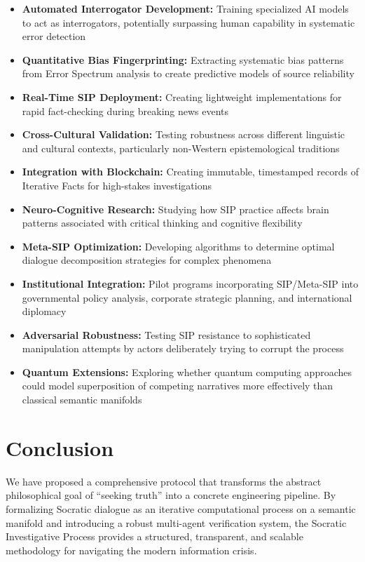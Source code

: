 \documentclass[11pt,a4paper]{article}
\begin{document}
\begin{small}
\begin{itemize}[leftmargin=*]
    \item \textbf{Automated Interrogator Development:} Training specialized AI models to act as interrogators, potentially surpassing human capability in systematic error detection
    \item \textbf{Quantitative Bias Fingerprinting:} Extracting systematic bias patterns from Error Spectrum analysis to create predictive models of source reliability
    \item \textbf{Real-Time SIP Deployment:} Creating lightweight implementations for rapid fact-checking during breaking news events
    \item \textbf{Cross-Cultural Validation:} Testing robustness across different linguistic and cultural contexts, particularly non-Western epistemological traditions
    \item \textbf{Integration with Blockchain:} Creating immutable, timestamped records of Iterative Facts for high-stakes investigations
    \item \textbf{Neuro-Cognitive Research:} Studying how SIP practice affects brain patterns associated with critical thinking and cognitive flexibility
    \item \textbf{Meta-SIP Optimization:} Developing algorithms to determine optimal dialogue decomposition strategies for complex phenomena
    \item \textbf{Institutional Integration:} Pilot programs incorporating SIP/Meta-SIP into governmental policy analysis, corporate strategic planning, and international diplomacy
    \item \textbf{Adversarial Robustness:} Testing SIP resistance to sophisticated manipulation attempts by actors deliberately trying to corrupt the process
    \item \textbf{Quantum Extensions:} Exploring whether quantum computing approaches could model superposition of competing narratives more effectively than classical semantic manifolds
\end{itemize}

\section{Conclusion}

We have proposed a comprehensive protocol that transforms the abstract philosophical goal of ``seeking truth'' into a concrete engineering pipeline. By formalizing Socratic dialogue as an iterative computational process on a semantic manifold and introducing a robust multi-agent verification system, the Socratic Investigative Process provides a structured, transparent, and scalable methodology for navigating the modern information crisis.


\end{small}
\end{document}
